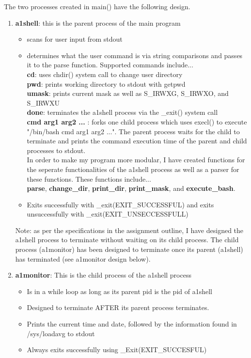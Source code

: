 \documentclass{article}
\begin{document}
\noindent
The two processes created in main() have the following design.
\begin{enumerate}
  \item \textbf{a1shell}: this is the parent process of the main program
   \begin{itemize}
     \item scans for user input from stdout
     \item determines what the user command is via string comparisons
       and passes it to the parse function. Supported commands include...\\

     \textbf{cd}: uses chdir() system call to change user directory \\
     \textbf{pwd}: prints working directory to stdout with getpwd\\
     \textbf{umask}: prints current mask as well as S\_IRWXG, S\_IRWXO, and S\_IRWXU\\
     \textbf{done}: terminates the a1shell process via the \_exit() system call \\
     \textbf{cmd arg1 arg2 ...} : forks one child process which uses execl() to execute
     "/bin/bash cmd arg1 arg2 ...". The parent process waits for the child to terminate
     and prints the command execution time of the parent and child processes to
     stdout. \\

    \noindent
    In order to make my program more modular, I have created functions
    for the seperate functionalities of the a1shell process as well as
    a parser for these functions. These functions include... \\
    \textbf{parse}, \textbf{change\_dir}, \textbf{print\_dir}, \textbf{print\_mask},
    and \textbf{execute\_bash}. \\

     \item Exits successfully with \_exit(EXIT\_SUCCESSFUL) and exits unsuccessfully
     with \_exit(EXIT\_UNSECCESSFULL)
   \end{itemize}

     Note: as per the specifications in the assignment outline, I have designed the a1shell
     process to terminate without waiting on its child process. The child process (a1monitor) has
     been designed to terminate once its parent (a1shell) has terminated (see a1monitor design
     below). \\
   \item \textbf{a1monitor}: This is the child process of the a1shell process
   \begin{itemize}
     \item Is in a while loop as long as its parent pid is the pid of a1shell
     \item Designed to terminate AFTER its parent process terminates.
     \item Prints the current time and date, followed by the information found
     in /sys/loadavg to stdout
     \item Always exits successfully using \_Exit(EXIT\_SUCCESFUL)
   \end{itemize}
\end{enumerate}
\end{document}
